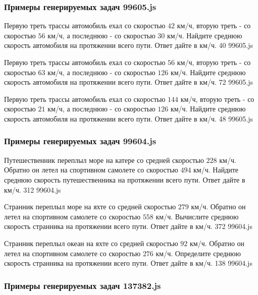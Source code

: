 \subsubsection*{Примеры генерируемых задач 99605.js}   

\par{Первую треть трассы автомобиль ехал со скоростью $42$ км/ч, вторую треть - со скоростью $56$ км/ч, а последнюю - со скоростью $30$ км/ч. Найдите среднюю скорость автомобиля на протяжении всего пути. Ответ дайте в км/ч. }{ 40 }{99605.js}
\par{Первую треть трассы автомобиль ехал со скоростью $56$ км/ч, вторую треть - со скоростью $63$ км/ч, а последнюю - со скоростью $126$ км/ч. Найдите среднюю скорость автомобиля на протяжении всего пути. Ответ дайте в км/ч. }{ 72 }{99605.js}
\par{Первую треть трассы автомобиль ехал со скоростью $144$ км/ч, вторую треть - со скоростью $21$ км/ч, а последнюю - со скоростью $126$ км/ч. Найдите среднюю скорость автомобиля на протяжении всего пути. Ответ дайте в км/ч. }{ 48 }{99605.js}


\subsubsection*{Примеры генерируемых задач 99604.js}   

\par{Путешественник переплыл море на катере со средней скоростью $228$ км/ч. Обратно он летел на спортивном самолете со скоростью $494$ км/ч. Найдите среднюю скорость путешественника на протяжении всего пути. Ответ дайте в км/ч. }{ 312 }{99604.js}
\par{Странник переплыл море на яхте со средней скоростью $279$ км/ч. Обратно он летел на спортивном самолете со скоростью $558$ км/ч. Вычислите среднюю скорость странника на протяжении всего пути. Ответ дайте в км/ч. }{ 372 }{99604.js}
\par{Странник переплыл океан на яхте со средней скоростью $92$ км/ч. Обратно он летел на спортивном самолете со скоростью $276$ км/ч. Определите среднюю скорость странника на протяжении всего пути. Ответ дайте в км/ч. }{ 138 }{99604.js}


\subsubsection*{Примеры генерируемых задач 137382.js}   

